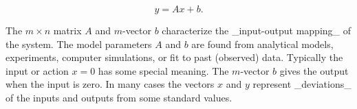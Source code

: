 \[y=Ax+b.\]

The \(m\times n\) matrix \(A\) and \(m\)-vector \(b\) characterize the _input-output mapping_ of the system. The model parameters \(A\) and \(b\) are found from analytical models, experiments, computer simulations, or fit to past (observed) data. Typically the input or action \(x=0\) has some special meaning. The \(m\)-vector \(b\) gives the output when the input is zero. In many cases the vectors \(x\) and \(y\) represent _deviations_ of the inputs and outputs from some standard values.

 